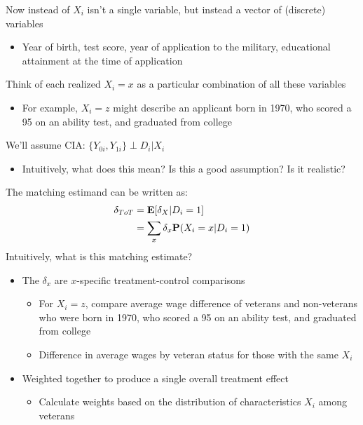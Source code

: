 \documentclass[compress, 8pt]{beamer}
\begin{document}
\begin{frame}{}

Now instead of $X_i$ isn't a single variable, but instead a vector of (discrete) variables
\begin{itemize}
    \item Year of birth, test score, year of application to the military, educational attainment at the time of application
\end{itemize}
Think of each realized $X_i=x$ as a particular combination of all these variables
\begin{itemize}
    \item {\color{DarkGray}For example, $X_i = z$ might describe an applicant born in 1970, who scored a 95 on an ability test, and graduated from college}
\end{itemize}
We'll assume CIA: $\{Y_{0i}, Y_{1i}\} \perp D_i \vert X_i$ 
\begin{itemize}
    \item Intuitively, what does this mean? Is this a good assumption? Is it realistic?
\end{itemize}
The matching estimand can be written as:
\begin{align*}
    \delta_{ToT} %
    &= \EE [\delta_X \vert D_i = 1] \\
    &= \sum_{x} \delta_x \PP(X_i = x \vert D_i = 1 ) 
\end{align*}
Intuitively, what is this matching estimate?
\begin{itemize}
    \item The $\delta_{x}$ are $x$-specific treatment-control comparisons
    \begin{itemize}
        \item {\color{DarkGray}For $X_i = z$, compare average wage difference of veterans and non-veterans who were born in 1970, who scored a 95 on an ability test, and graduated from college}
        \item Difference in average wages by veteran status for those with the same $X_i$
    \end{itemize}
    \item Weighted together to produce a single overall treatment effect
    \begin{itemize}
        \item {\color{DarkGray} Calculate weights based on the distribution of characteristics $X_i$ among veterans}
    \end{itemize}
\end{itemize}

\end{frame}
\end{document}

